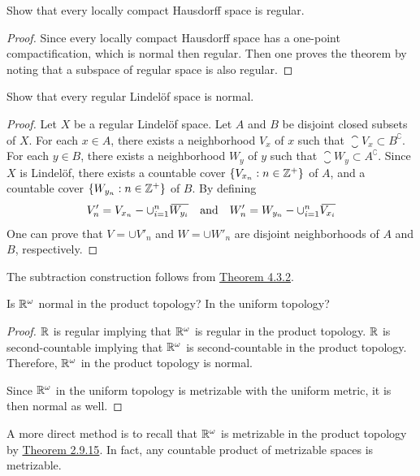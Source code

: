 \documentclass[12pt,a4paper]{article}
\begin{document}
    \begin{ex}
        Show that every locally compact Hausdorff space is regular.
    \end{ex}
    \begin{proof}
        Since every locally compact Hausdorff space has a one-point compactification, which is normal then regular. Then one proves the theorem by noting that a subspace of regular space is also regular.
    \end{proof}
    \hfill

    \begin{ex}
        Show that every regular Lindel\"of space is normal.
    \end{ex}
    \begin{proof}
        Let $X$ be a regular Lindel\"of space. Let $A$ and $B$ be disjoint closed subsets of $X$. For each $x\in A$, there exists a neighborhood $V_x$ of $x$ such that $\closure{V_x}\subset B^\complement$. For each $y\in B$, there exists a neighborhood $W_y$ of $y$ such that $\closure{W_y}\subset A^\complement$. Since $X$ is Lindel\"of, there exists a countable cover $\left\{V_{x_n}:n\in\mathbb{Z}^+\right\}$ of $A$, and a countable cover $\left\{W_{y_n}:n\in\mathbb{Z}^+\right\}$ of $B$. By defining
        $$
        V'_n=V_{x_n}-\cup_{i=1}^n{}\mkern3mu\overline{\mkern-3muW_{y_i}}\quad\text{and}\quad W'_n=W_{y_n}-\cup_{i=1}^n{}\mkern3mu\overline{\mkern-3muV_{x_i}}
        $$
        One can prove that $V=\cup V'_n$ and $W=\cup W'_n$ are disjoint neighborhoods of $A$ and $B$, respectively.
    \end{proof}
    \begin{remark}
        The subtraction construction follows from \hyperref[4.3.2]{Theorem 4.3.2}.
    \end{remark}
    \hfill

    \begin{ex}
        Is $\mathbb{R}^\omega$ normal in the product topology? In the uniform topology?
    \end{ex}
    \begin{proof}
        $\mathbb{R}$ is regular implying that $\mathbb{R}^\omega$ is regular in the product topology. $\mathbb{R}$ is second-countable implying that $\mathbb{R}^\omega$ is second-countable in the product topology. Therefore, $\mathbb{R}^\omega$ in the product topology is normal.

        Since $\mathbb{R}^\omega$ in the uniform topology is metrizable with the uniform metric, it is then normal as well.
    \end{proof}
    \begin{remark}
        A more direct method is to recall that $\mathbb{R}^\omega$ is metrizable in the product topology by \hyperlink{2.9.15}{Theorem 2.9.15}. In fact, any countable product of metrizable spaces is metrizable. 
    \end{remark}
    \hfill
\end{document}
